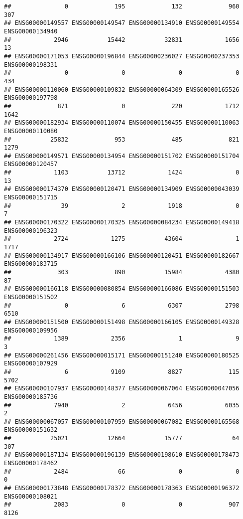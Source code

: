 \documentclass[
]{article}
\begin{document}
\begin{verbatim}
##               0             195             132             960             307 
## ENSG00000149557 ENSG00000149547 ENSG00000134910 ENSG00000149554 ENSG00000134940 
##            2946           15442           32831            1656              13 
## ENSG00000171053 ENSG00000196844 ENSG00000236027 ENSG00000237353 ENSG00000198331 
##               0               0               0               0             434 
## ENSG00000110060 ENSG00000109832 ENSG00000064309 ENSG00000165526 ENSG00000197798 
##             871               0             220            1712            1642 
## ENSG00000182934 ENSG00000110074 ENSG00000150455 ENSG00000110063 ENSG00000110080 
##           25832             953             485             821            1279 
## ENSG00000149571 ENSG00000134954 ENSG00000151702 ENSG00000151704 ENSG00000120457 
##            1103           13712            1424               0              13 
## ENSG00000174370 ENSG00000120471 ENSG00000134909 ENSG00000043039 ENSG00000151715 
##              39               2            1918               0               7 
## ENSG00000170322 ENSG00000170325 ENSG00000084234 ENSG00000149418 ENSG00000196323 
##            2724            1275           43604               1            1717 
## ENSG00000134917 ENSG00000166106 ENSG00000120451 ENSG00000182667 ENSG00000183715 
##             303             890           15984            4380              87 
## ENSG00000166118 ENSG00000080854 ENSG00000166086 ENSG00000151503 ENSG00000151502 
##               0               6            6307            2798            6510 
## ENSG00000151500 ENSG00000151498 ENSG00000166105 ENSG00000149328 ENSG00000109956 
##            1389            2356               1               9               3 
## ENSG00000261456 ENSG00000015171 ENSG00000151240 ENSG00000180525 ENSG00000107929 
##               6            9109            8827             115            5702 
## ENSG00000107937 ENSG00000148377 ENSG00000067064 ENSG00000047056 ENSG00000185736 
##            7940               2            6456            6035               2 
## ENSG00000067057 ENSG00000107959 ENSG00000067082 ENSG00000165568 ENSG00000151632 
##           25021           12664           15777              64             307 
## ENSG00000187134 ENSG00000196139 ENSG00000198610 ENSG00000178473 ENSG00000178462 
##            2484              66               0               0               0 
## ENSG00000173848 ENSG00000178372 ENSG00000178363 ENSG00000196372 ENSG00000108021 
##            2083               0               0             907            8126 

\end{verbatim}
\end{document}
